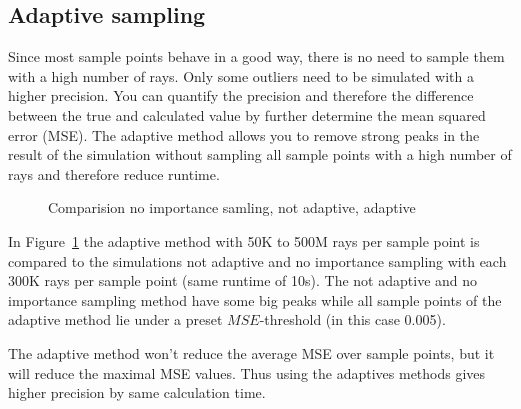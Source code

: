 \subsection{Adaptive sampling}
Since most sample points behave in a good way, there is no need
to sample them with a high number of rays. Only some outliers need to
be simulated with a higher precision. You can quantify the precision
and therefore the difference between the true and calculated value by
further determine the mean squared error (MSE).
The adaptive method allows you to remove strong peaks in the result
of the simulation without sampling all sample points with
a high number of rays and therefore reduce runtime.
\begin{figure}
  \centerline{
    }
  \caption{Comparision no importance samling, not adaptive, adaptive}
  \label{plot:adaptive}
\end{figure}

In Figure~\ref{plot:adaptive} the adaptive method with 
50K to 500M rays per sample point is compared to the simulations
not adaptive and no importance sampling with each 300K rays per sample point (same runtime of 10s).
The not adaptive and no importance sampling method have some big peaks while all sample points of 
the adaptive method lie under a preset $MSE$-threshold (in this case 0.005). 

The adaptive method won't reduce the average MSE over sample points,
but it will reduce the maximal MSE values. Thus using the adaptives
methods gives higher precision by same calculation time.



